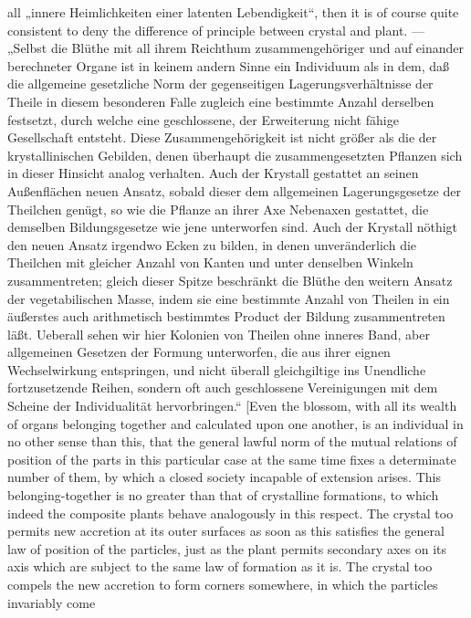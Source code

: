 \documentclass[12pt,a4paper]{book}
\begin{document}
{all „innere Heimlichkeiten einer latenten Lebendigkeit“, then it is of course
quite consistent to deny the difference of principle between crystal and plant.
--- „Selbst die Blüthe mit all ihrem Reichthum zusammengehöriger und auf
einander berechneter
Organe ist in keinem andern Sinne ein Individuum als in dem, daß die
allgemeine gesetzliche Norm der gegenseitigen Lagerungsverhältnisse der
Theile in diesem besonderen Falle zugleich eine bestimmte Anzahl
derselben festsetzt, durch welche eine geschlossene, der Erweiterung
nicht fähige Gesellschaft entsteht. Diese Zusammengehörigkeit ist nicht
größer als die der krystallinischen Gebilden, denen überhaupt die
zusammengesetzten Pflanzen sich in dieser Hinsicht analog verhalten.
Auch der Krystall gestattet an seinen Außenflächen neuen Ansatz, sobald
dieser dem allgemeinen Lagerungsgesetze der Theilchen genügt, so wie die
Pflanze an ihrer Axe Nebenaxen gestattet, die demselben Bildungsgesetze
wie jene unterworfen sind. Auch der Krystall nöthigt den neuen Ansatz
irgendwo Ecken zu bilden, in denen unveränderlich die Theilchen mit
gleicher Anzahl von Kanten und unter denselben Winkeln zusammentreten;
gleich dieser Spitze beschränkt die Blüthe den weitern Ansatz der
vegetabilischen Masse, indem sie eine bestimmte Anzahl von Theilen in ein
äußerstes auch arithmetisch bestimmtes Product der Bildung
zusammentreten läßt. Ueberall sehen wir hier Kolonien von Theilen ohne
inneres Band, aber allgemeinen Gesetzen der Formung unterworfen, die aus
ihrer eignen Wechselwirkung entspringen, und nicht überall gleichgiltige
ins Unendliche fortzusetzende Reihen, sondern oft auch geschlossene
Vereinigungen mit dem Scheine der Individualität hervorbringen.“ [Even the
blossom, with all its wealth of organs belonging together and calculated upon
one another, is an individual in no other sense than this, that the general
lawful norm of the mutual relations of position of the parts in this particular
case at the same time fixes a determinate number of them, by which a closed
society incapable of extension arises. This belonging-together is no greater
than that of crystalline formations, to which indeed the composite plants
behave analogously in this respect. The crystal too permits new accretion at
its outer surfaces as soon as this satisfies the general law of position of the
particles, just as the plant permits secondary axes on its axis which are
subject to the same law of formation as it is. The crystal too compels the new
accretion to form corners somewhere, in which the particles invariably come
}
\end{document}
